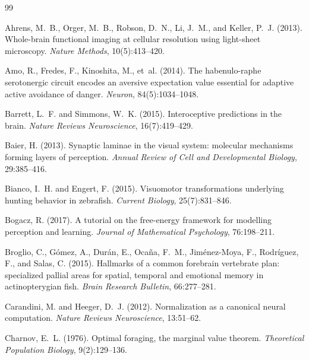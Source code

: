 \documentclass[12pt]{article}
\begin{document}

\begingroup
\begin{thebibliography}{99}

Ahrens, M.~B., Orger, M.~B., Robson, D.~N., Li, J.~M., and Keller, P.~J. (2013).
Whole-brain functional imaging at cellular resolution using light-sheet microscopy.
\textit{Nature Methods}, 10(5):413--420.

Amo, R., Fredes, F., Kinoshita, M., et~al. (2014).
The habenulo-raphe serotonergic circuit encodes an aversive expectation value essential for adaptive active avoidance of danger.
\textit{Neuron}, 84(5):1034--1048.

Barrett, L.~F. and Simmons, W.~K. (2015).
Interoceptive predictions in the brain.
\textit{Nature Reviews Neuroscience}, 16(7):419--429.

Baier, H. (2013).
Synaptic laminae in the visual system: molecular mechanisms forming layers of perception.
\textit{Annual Review of Cell and Developmental Biology}, 29:385--416.

Bianco, I.~H. and Engert, F. (2015).
Visuomotor transformations underlying hunting behavior in zebrafish.
\textit{Current Biology}, 25(7):831--846.

Bogacz, R. (2017).
A tutorial on the free-energy framework for modelling perception and learning.
\textit{Journal of Mathematical Psychology}, 76:198--211.

Broglio, C., G{\'o}mez, A., Dur{\'a}n, E., Oca{\~n}a, F.~M., Jim{\'e}nez-Moya, F., Rodr{\'i}guez, F., and Salas, C. (2015).
Hallmarks of a common forebrain vertebrate plan: specialized pallial areas for spatial, temporal and emotional memory in actinopterygian fish.
\textit{Brain Research Bulletin}, 66:277--281.

Carandini, M. and Heeger, D.~J. (2012).
Normalization as a canonical neural computation.
\textit{Nature Reviews Neuroscience}, 13:51--62.

Charnov, E.~L. (1976).
Optimal foraging, the marginal value theorem.
\textit{Theoretical Population Biology}, 9(2):129--136.


\end{thebibliography}
\end{document}

